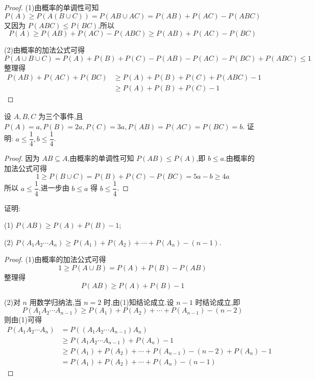 \begin{proof}
    (1)由概率的单调性可知
    $$
    P(A) \geqslant P(A(B \cup C)) = P(AB \cup AC) = P(AB) + P(AC) - P(ABC)
    $$
    又因为 $P(ABC) \leqslant P(BC)$,所以
    $$
    P(A) \geqslant P(AB) + P(AC) - P(ABC) \geqslant P(AB) + P(AC) - P(BC)
    $$

    (2)由概率的加法公式可得
    $$
    P(A \cup B \cup C) = P(A) + P(B) + P(C) - P(AB) - P(AC) - P(BC) + P(ABC) \leqslant 1
    $$
    整理得
    $$
    \begin{aligned}
        P(AB) + P(AC) + P(BC) &\geqslant P(A) + P(B) + P(C) + P(ABC) - 1 \\
        & \geqslant P(A) + P(B) + P(C) - 1
    \end{aligned}
    $$
\end{proof}

\question 设 $A,B,C$ 为三个事件,且 $P(A) = a, P(B) = 2a, P(C) = 3a, P(AB) = P(AC) = P(BC) = b$. 证明: $a \leqslant \dfrac{1}{4}, b \leqslant \dfrac{1}{4}$.

\begin{proof}
    因为 $AB \subseteq A$,由概率的单调性可知 $P(AB) \leqslant P(A)$,即 $b \leqslant a$.由概率的加法公式可得
    $$
    1 \geqslant P(B \cup C) = P(B) + P(C) - P(BC) = 5a-b \geqslant 4a
    $$
    所以 $a \leqslant \dfrac{1}{4}$.进一步由 $b \leqslant a$ 得 $b \leqslant \dfrac{1}{4}$.
\end{proof}

\question 证明:

(1) $P(AB) \geqslant P(A) + P(B) - 1$;

(2) $P(A_1 A_2 \cdots A_n) \geqslant P(A_1) + P(A_2) + \cdots + P(A_n) - (n-1)$.

\begin{proof}
    (1)由概率的加法公式可得
    $$
    1 \geqslant P(A \cup B) = P(A) + P(B) - P(AB)
    $$
    整理得
    $$
    P(AB) \geqslant P(A) + P(B) - 1
    $$

    (2)对 $n$ 用数学归纳法,当 $n=2$ 时,由(1)知结论成立.设 $n-1$ 时结论成立,即
    $$
    P(A_1 A_2 \cdots A_{n-1}) \geqslant P(A_1) + P(A_2) + \cdots + P(A_{n-1}) - (n-2)
    $$
    则由(1)可得
    $$
    \begin{aligned}
        P(A_1 A_2 \cdots A_n) &= P((A_1 A_2 \cdots A_{n-1}) A_n) \\
        & \geqslant P(A_1 A_2 \cdots A_{n-1}) + P(A_n) - 1 \\
        & \geqslant P(A_1) + P(A_2) + \cdots + P(A_{n-1}) - (n-2) + P(A_n) - 1 \\
        &= P(A_1) + P(A_2) + \cdots + P(A_n) - (n-1)
    \end{aligned}
    $$
\end{proof}

